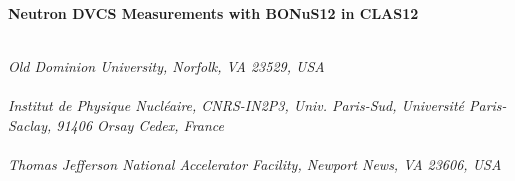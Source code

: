 \begin{titlepage}
     \begin{center}
       \vspace*{-1.8cm}
       \noindent \Huge \textbf{Neutron DVCS Measurements with BONuS12 in 
        CLAS12} \\
     \end{center}
   
\renewcommand{\thefootnote}{\fnsymbol{footnote}}
     \begin{center}


       \vspace*{1.0cm}
         \\
       \vspace*{0.2cm}
       \noindent \emph{Old Dominion University, Norfolk, VA 23529, USA} \\


       \vspace*{1.0cm}
         \\
       \vspace*{0.2cm}
       \noindent \emph{Institut de Physique Nucl\'eaire, CNRS-IN2P3, Univ. Paris-Sud, 
                       Universit\'e Paris-Saclay, 91406 Orsay Cedex, France} \\
       
        \vspace*{1.0cm}
        \\
       \vspace*{0.2cm}
       \noindent \emph{Thomas Jefferson National Accelerator Facility, Newport News, VA 23606, USA} \\
        
        
        
        
        
        \vspace*{0.7cm}
        \\
      \end{center}
\renewcommand*{\thefootnote}{\arabic{footnote}}

\date{\today}
     

\end{titlepage}
\sloppy

\titlepage
